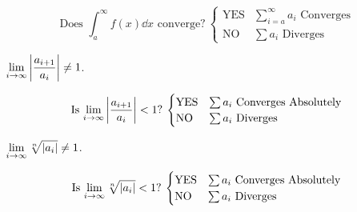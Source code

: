 \documentclass{article}
\theoremstyle{plain}
\numberwithin{theorem}{subsection}
\theoremstyle{definition}
\numberwithin{definition}{subsection}
\theoremstyle{remark}
\numberwithin{note}{subsection}
\begin{document}
\begin{multicols}{2}
\begin{mdframed}[style=exampledefaultcols,frametitle={Integral Test}]
		\begin{equation*}
			\text{Does $\int_a^\infty f(x) \dd{x}$ converge?}\:
			\begin{cases}
				\text{YES} & \text{$\sum_{i=a}^\infty a_i$ Converges} \\
				\text{NO} & \text{$\sum a_i$ Diverges}
			\end{cases}
		\end{equation*}
	\end{mdframed}
	\begin{mdframed}[style=exampledefaultcols,frametitle={Ratio Test}]
		\begin{description}[style=sameline]
			\item[Conditions] $\displaystyle \lim_{i\to\infty}\abs{\frac{a_{i+1}}{a_i}}\neq 1$.
		\end{description}
		\begin{equation*}
			\text{Is $\lim_{i\to\infty}\abs{\frac{a_{i+1}}{a_i}} < 1$?}\:
			\begin{cases}
				\text{YES} & \text{$\sum a_i$ Converges Absolutely} \\
				\text{NO} & \text{$\sum a_i$ Diverges}
			\end{cases}
		\end{equation*}
	\end{mdframed}
	\begin{mdframed}[style=exampledefaultcols,frametitle={Root Test}]
		\begin{description}[style=sameline]
			\item[Conditions] $\displaystyle \lim_{i\to\infty}\sqrt[n]{\abs{a_i}}\neq 1$.
		\end{description}
		\begin{equation*}
			\text{Is $\lim_{i\to\infty}\sqrt[n]{\abs{a_i}} < 1$?}\:
			\begin{cases}
				\text{YES} & \text{$\sum a_i$ Converges Absolutely} \\
				\text{NO} & \text{$\sum a_i$ Diverges}
			\end{cases}
		\end{equation*}
	\end{mdframed}
\end{multicols}
%
\end{document}
